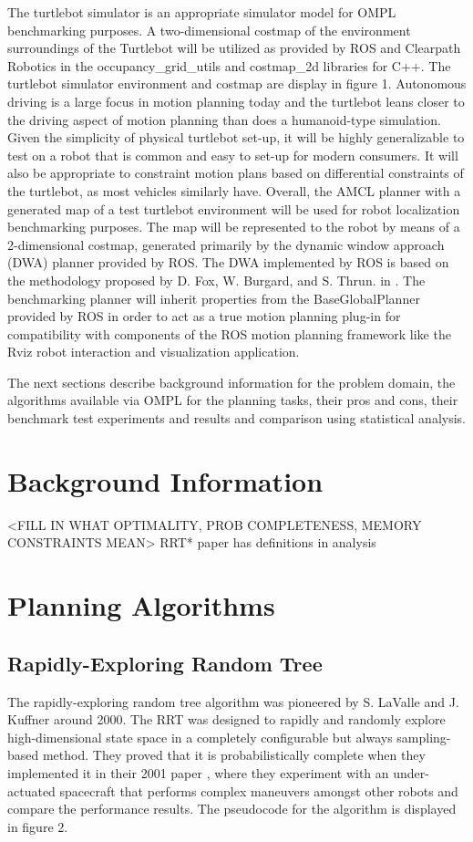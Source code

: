 \documentclass[conference]{IEEEtran} \usepackage[T1]{fontenc} \usepackage[backend=biber, style=ieee]{biblatex}
\begin{document}
The turtlebot simulator is an appropriate simulator model for OMPL benchmarking purposes. A two-dimensional costmap of the environment surroundings of the Turtlebot
will be utilized as provided by ROS and Clearpath Robotics in the occupancy_grid_utils and costmap_2d libraries for C++. The turtlebot simulator environment and costmap 
are display in figure 1. Autonomous driving is a large focus in motion planning today and the turtlebot leans closer to the driving aspect of motion planning than does a 
humanoid-type simulation. Given the simplicity of physical turtlebot set-up, it will be highly generalizable to test on a robot that is common and easy to set-up for 
modern consumers. It will also be appropriate to constraint motion plans based on differential constraints of the turtlebot, as most vehicles similarly have. Overall, the 
AMCL planner with a generated map of a test turtlebot environment will be used for robot localization benchmarking purposes. The map will be represented to the robot by 
means of a 2-dimensional costmap, generated primarily by the dynamic window approach (DWA) planner provided by ROS. The DWA implemented by ROS is based on the 
methodology proposed by D. Fox, W. Burgard, and S. Thrun. in \cite{dwa}. The benchmarking planner will inherit properties from the BaseGlobalPlanner provided by ROS in 
order to act as a true motion planning plug-in for compatibility with components of the ROS motion planning framework like the Rviz robot interaction and visualization 
application.

The next sections describe background information for the problem domain, the algorithms available via OMPL for the planning tasks, their pros and cons, their benchmark 
test experiments and results and comparison using statistical analysis.

\section{Background Information} \label{Background Information}

<FILL IN WHAT OPTIMALITY, PROB COMPLETENESS, MEMORY CONSTRAINTS MEAN> RRT* paper has definitions in analysis

\section{Planning Algorithms} \label{Planning Algorithms}

\subsection{Rapidly-Exploring Random Tree} \label{RRT}
The rapidly-exploring random tree algorithm was pioneered by S. LaValle and J. Kuffner around 2000. The RRT was designed to rapidly and randomly explore high-dimensional
state space in a completely configurable but always sampling-based method. They proved that it is probabilistically complete when they implemented it in their 2001 paper 
\cite{random_kinodynamics}, where they experiment with an under-actuated spacecraft that performs complex maneuvers amongst other robots and compare the performance 
results. The pseudocode for the algorithm is displayed in figure 2.
\end{document}
